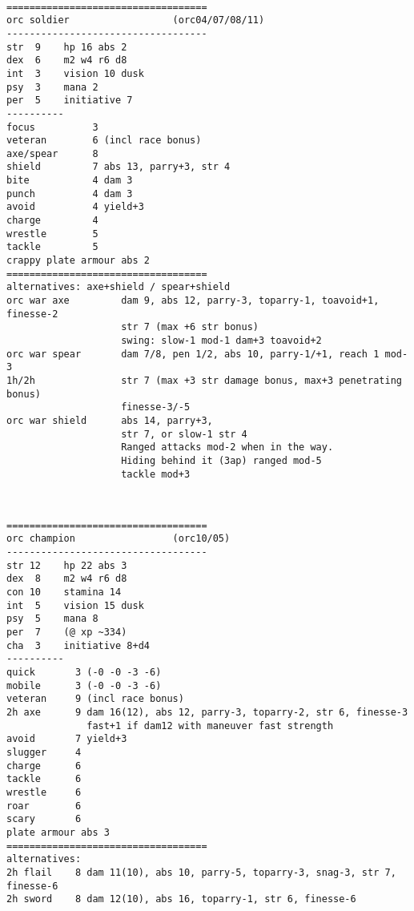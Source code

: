 \

\goodbreak \begin{samepage} \small \begin{verbatim}
===================================
orc soldier                  (orc04/07/08/11)
-----------------------------------
str  9    hp 16 abs 2
dex  6    m2 w4 r6 d8
int  3    vision 10 dusk
psy  3    mana 2
per  5    initiative 7
----------
focus          3
veteran        6 (incl race bonus)
axe/spear      8
shield         7 abs 13, parry+3, str 4
bite           4 dam 3
punch          4 dam 3
avoid          4 yield+3
charge         4
wrestle        5
tackle         5
crappy plate armour abs 2
===================================
alternatives: axe+shield / spear+shield
orc war axe         dam 9, abs 12, parry-3, toparry-1, toavoid+1, finesse-2
                    str 7 (max +6 str bonus)
                    swing: slow-1 mod-1 dam+3 toavoid+2
orc war spear       dam 7/8, pen 1/2, abs 10, parry-1/+1, reach 1 mod-3
1h/2h               str 7 (max +3 str damage bonus, max+3 penetrating bonus)
                    finesse-3/-5
orc war shield      abs 14, parry+3,
                    str 7, or slow-1 str 4
                    Ranged attacks mod-2 when in the way.
                    Hiding behind it (3ap) ranged mod-5
                    tackle mod+3
\end{verbatim} \normalsize \end{samepage}

\

\goodbreak \begin{samepage} \small \begin{verbatim}
===================================
orc champion                 (orc10/05)
-----------------------------------
str 12    hp 22 abs 3
dex  8    m2 w4 r6 d8
con 10    stamina 14
int  5    vision 15 dusk
psy  5    mana 8
per  7    (@ xp ~334)
cha  3    initiative 8+d4
----------
quick       3 (-0 -0 -3 -6)
mobile      3 (-0 -0 -3 -6)
veteran     9 (incl race bonus)
2h axe      9 dam 16(12), abs 12, parry-3, toparry-2, str 6, finesse-3
              fast+1 if dam12 with maneuver fast strength
avoid       7 yield+3
slugger     4
charge      6
tackle      6
wrestle     6
roar        6
scary       6
plate armour abs 3
===================================
alternatives:
2h flail    8 dam 11(10), abs 10, parry-5, toparry-3, snag-3, str 7, finesse-6
2h sword    8 dam 12(10), abs 16, toparry-1, str 6, finesse-6
\end{verbatim} \normalsize \end{samepage}

